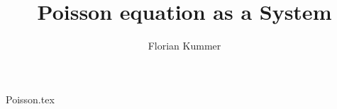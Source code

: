 \documentclass[10pt,a4paper]{article}
\title{Poisson equation as a System}
\author{Florian Kummer}
\begin{document}
\maketitle

{Poisson.tex}
\end{document}
